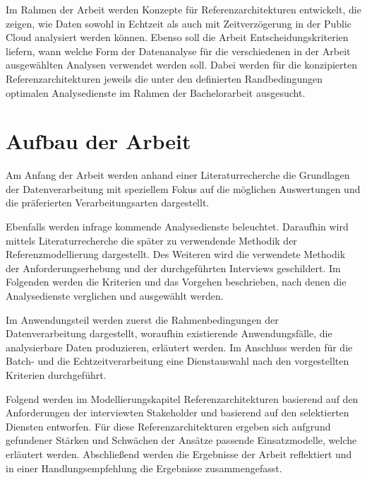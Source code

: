 Im Rahmen der Arbeit werden Konzepte für Referenzarchitekturen entwickelt, die zeigen, wie Daten sowohl in Echtzeit als auch mit Zeitverzögerung in der Public Cloud analysiert werden können. 
Ebenso soll die Arbeit Entscheidungskriterien liefern, wann welche Form der Datenanalyse für die verschiedenen in der Arbeit ausgewählten Analysen verwendet werden soll. 
Dabei werden für die konzipierten Referenzarchitekturen jeweils die unter den definierten Randbedingungen optimalen Analysedienste im Rahmen der Bachelorarbeit ausgesucht.

\section{Aufbau der Arbeit}

Am Anfang der Arbeit werden anhand einer Literaturrecherche die Grundlagen der Datenverarbeitung mit speziellem Fokus auf die möglichen Auswertungen und die präferierten Verarbeitungsarten dargestellt. 

Ebenfalls werden infrage kommende Analysedienste beleuchtet. 
Daraufhin wird mittels Literaturrecherche die später zu verwendende Methodik der Referenzmodellierung dargestellt. 
Des Weiteren wird die verwendete Methodik der Anforderungserhebung und der durchgeführten Interviews geschildert. 
Im Folgenden werden die Kriterien und das Vorgehen beschrieben, nach denen die Analysedienste verglichen und ausgewählt werden. 

Im Anwendungsteil werden zuerst die Rahmenbedingungen der Datenverarbeitung dargestellt, woraufhin existierende Anwendungsfälle, die analysierbare Daten produzieren, erläutert werden. 
Im Anschluss werden für die Batch- und die Echtzeitverarbeitung eine Dienstauswahl nach den vorgestellten Kriterien durchgeführt. 

Folgend werden im Modellierungskapitel Referenzarchitekturen basierend auf den Anforderungen der interviewten Stakeholder und basierend auf den selektierten Diensten entworfen. Für diese Referenzarchitekturen ergeben sich aufgrund gefundener Stärken und
Schwächen der Ansätze passende Einsatzmodelle, welche erläutert werden. Abschließend werden die Ergebnisse der Arbeit reflektiert und in einer Handlungsempfehlung die Ergebnisse zusammengefasst.